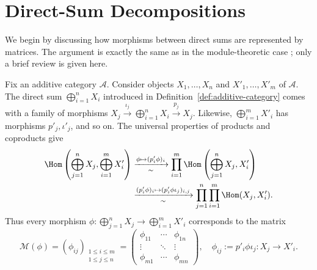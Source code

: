 
\section{Direct-Sum Decompositions}\label{sec:direct-sum}
\hypertarget{o014.aljabr2.chapter2.direct-sum-decomposition}{ }

We begin by discussing how morphisms between direct sums are represented by
matrices. The argument is exactly the same as in the module-theoretic case
\cite[\S 6.3]{Li1}; only a brief review is given here.

Fix an additive category $\mathcal{A}$. Consider objects
$X_1,\ldots,X_n$ and $X'_1,\ldots,X'_m$ of $\mathcal{A}$. The direct sum
$\bigoplus_{i=1}^nX_i$ introduced in
Definition~\ref{def:additive-category} comes with a family of morphisms
$X_j\xrightarrow{\iota_j}\bigoplus_{i=1}^nX_i\xrightarrow{p_j}X_j$.
Likewise, $\bigoplus_{i=1}^mX'_i$ has morphisms $p'_j,\iota'_j$, and so on.
The universal properties of products and coproducts give
\begin{align*}
	\Hom \left( \bigoplus_{j=1}^n X_j, \bigoplus_{i=1}^m X'_i \right) & \xrightarrow[\sim]{\phi \mapsto (p'_i \phi)_i } \prod_{i=1}^m \Hom\left(\bigoplus_{j=1}^n X_j , X'_i \right) \\
	& \xrightarrow[\sim]{(p'_i \phi)_i \mapsto (p'_i \phi \iota_j)_{i, j}} \prod_{j=1}^n \prod_{i=1}^m  \Hom(X_j, X'_i).
\end{align*}
Thus every morphism
$\phi:\bigoplus_{j=1}^nX_j\to\bigoplus_{i=1}^mX'_i$ corresponds to the
matrix
\[ \mathcal{M}(\phi) = (\phi_{ij})_{\substack{1 \leq i \leq m \\ 1 \leq j \leq n}} = \begin{pmatrix}
	\phi_{11} & \cdots & \phi_{1n} \\
	\vdots & \ddots & \vdots \\
	\phi_{m1} & \cdots & \phi_{mn}
\end{pmatrix}, \quad \phi_{ij} := p'_i \phi \iota_j: X_j \to X'_i. \]

